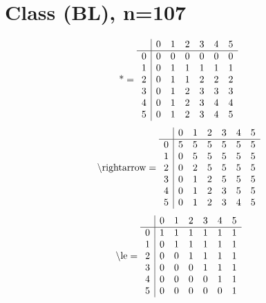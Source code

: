 \documentclass[11pt]{article}
\begin{document}
\section{Class (BL), n=107}
\[\text{*} = 
\begin{array}{r | r r r r r r}
 & 0 & 1 & 2 & 3 & 4 & 5 \\ \hline
0 & 0 & 0 & 0 & 0 & 0 & 0 \\
1 & 0 & 1 & 1 & 1 & 1 & 1 \\
2 & 0 & 1 & 1 & 2 & 2 & 2 \\
3 & 0 & 1 & 2 & 3 & 3 & 3 \\
4 & 0 & 1 & 2 & 3 & 4 & 4 \\
5 & 0 & 1 & 2 & 3 & 4 & 5 \\
\end{array}
\]
\[\text{\textbackslash rightarrow} = 
\begin{array}{r | r r r r r r}
 & 0 & 1 & 2 & 3 & 4 & 5 \\ \hline
0 & 5 & 5 & 5 & 5 & 5 & 5 \\
1 & 0 & 5 & 5 & 5 & 5 & 5 \\
2 & 0 & 2 & 5 & 5 & 5 & 5 \\
3 & 0 & 1 & 2 & 5 & 5 & 5 \\
4 & 0 & 1 & 2 & 3 & 5 & 5 \\
5 & 0 & 1 & 2 & 3 & 4 & 5 \\
\end{array}
\]
\[\text{\textbackslash le} = 
\begin{array}{r | r r r r r r}
 & 0 & 1 & 2 & 3 & 4 & 5 \\ \hline
0 & 1 & 1 & 1 & 1 & 1 & 1 \\
1 & 0 & 1 & 1 & 1 & 1 & 1 \\
2 & 0 & 0 & 1 & 1 & 1 & 1 \\
3 & 0 & 0 & 0 & 1 & 1 & 1 \\
4 & 0 & 0 & 0 & 0 & 1 & 1 \\
5 & 0 & 0 & 0 & 0 & 0 & 1 \\
\end{array}
\]
\end{document}
